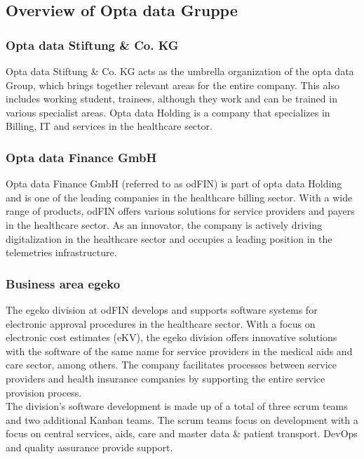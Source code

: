 \subsection{Overview of Opta data Gruppe}
\normalsize

\subsubsection{Opta data Stiftung \& Co. KG }
Opta data Stiftung \& Co. KG acts as the umbrella organization of the opta data Group,
which brings together relevant areas for the entire company. This also includes working student, trainees, although they work and can be trained in various specialist areas. Opta data Holding is a company that specializes in
Billing, IT and services in the healthcare sector.\\ 
\subsubsection{Opta data Finance GmbH  }
Opta data Finance GmbH (referred to as odFIN) is part of opta data Holding and is one of the leading companies in the healthcare billing sector. With a wide range of products, odFIN offers various solutions for service providers and payers in the healthcare sector. As an innovator, the company is actively driving digitalization in the healthcare sector and occupies a leading position in the telemetries infrastructure.\\ 

\subsubsection{Business area egeko  }
The egeko division at odFIN develops and supports software systems for electronic approval procedures in the healthcare sector. With a focus on electronic cost estimates (eKV), the egeko division offers innovative solutions with the software of the same name for service providers in the medical aids and care sector, among others. The company facilitates processes between service providers and health insurance companies by supporting the entire service provision process.\\
The division's software development is made up of a total of three scrum teams and two additional Kanban teams. The scrum teams focus on development with a focus on central services, aids, care and master data \& patient transport. DevOps and quality assurance provide support. 


